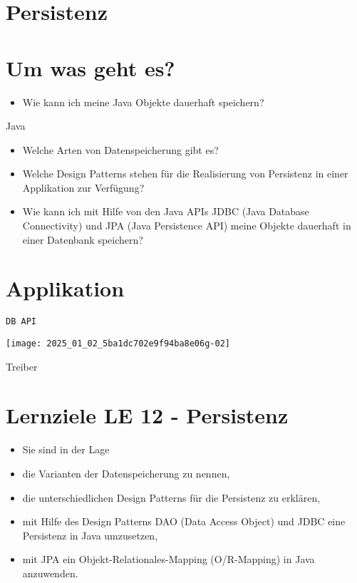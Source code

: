 \section{Persistenz}

\section*{Um was geht es?}
\begin{itemize}
  \item Wie kann ich meine Java Objekte dauerhaft speichern?
\end{itemize}

Java

\begin{itemize}
  \item Welche Arten von Datenspeicherung gibt es?
  \item Welche Design Patterns stehen für die Realisierung von Persistenz in einer Applikation zur Verfügung?
  \item Wie kann ich mit Hilfe von den Java APIs JDBC (Java Database Connectivity) und JPA (Java Persistence API) meine Objekte dauerhaft in einer Datenbank speichern?
\end{itemize}

\section*{Applikation}
\begin{verbatim}
DB API
\end{verbatim}

\begin{center}
\texttt{[image: 2025\_01\_02\_5ba1dc702e9f94ba8e06g-02]}
\end{center}

Treiber

\section*{Lernziele LE 12 - Persistenz}
\begin{itemize}
  \item Sie sind in der Lage
  \item die Varianten der Datenspeicherung zu nennen,
  \item die unterschiedlichen Design Patterns für die Persistenz zu erklären,
  \item mit Hilfe des Design Patterns DAO (Data Access Object) und JDBC eine Persistenz in Java umzusetzen,
  \item mit JPA ein Objekt-Relationales-Mapping (O/R-Mapping) in Java anzuwenden.
\end{itemize}

